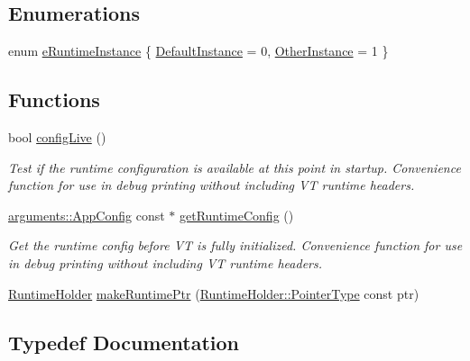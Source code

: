 \subsection*{Enumerations}
\begin{DoxyCompactItemize}
\item 
enum \hyperlink{namespacevt_1_1runtime_afca910c1b38b3975f7c1da8001a77d58}{e\+Runtime\+Instance} \{ \hyperlink{namespacevt_1_1runtime_afca910c1b38b3975f7c1da8001a77d58af4b803eff3cdc140ed473828f9c89101}{Default\+Instance} = 0, 
\hyperlink{namespacevt_1_1runtime_afca910c1b38b3975f7c1da8001a77d58af541bede5bc84a16357c26d30a508ff4}{Other\+Instance} = 1
 \}
\end{DoxyCompactItemize}
\subsection*{Functions}
\begin{DoxyCompactItemize}
\item 
bool \hyperlink{namespacevt_1_1runtime_a1b0a3ff1332edc6e0fccbbbc803ac895}{config\+Live} ()
\begin{DoxyCompactList}\small\item\em Test if the runtime configuration is available at this point in startup. Convenience function for use in debug printing without including VT runtime headers. \end{DoxyCompactList}\item 
\hyperlink{structvt_1_1arguments_1_1_app_config}{arguments\+::\+App\+Config} const  $\ast$ \hyperlink{namespacevt_1_1runtime_a8dfbd8b00276c812dc7646cf658cc95d}{get\+Runtime\+Config} ()
\begin{DoxyCompactList}\small\item\em Get the runtime config before VT is fully initialized. Convenience function for use in debug printing without including VT runtime headers. \end{DoxyCompactList}\item 
\hyperlink{structvt_1_1runtime_1_1_runtime_holder}{Runtime\+Holder} \hyperlink{namespacevt_1_1runtime_a71998fecf2a4d70b11e3ae4aa47810db}{make\+Runtime\+Ptr} (\hyperlink{structvt_1_1runtime_1_1_runtime_holder_a9740e8aa7487fcf38b67a7e160d7b046}{Runtime\+Holder\+::\+Pointer\+Type} const ptr)
\end{DoxyCompactItemize}


\subsection{Typedef Documentation}
\mbox{\label{namespacevt_1_1runtime_ab09d044cce417fbcdb7e1e29b7aabbc3}} 
